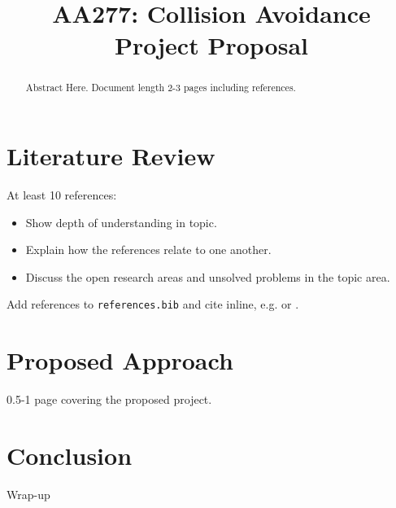 \documentclass[conference]{IEEEtran}
\begin{document}
\title{AA277: Collision Avoidance Project Proposal\\
}

\author{
\and
{}
\and
{}
\and
{}
}

\maketitle

\begin{abstract}
Abstract Here. Document length 2-3 pages including references.
\end{abstract}

\section{Literature Review}
At least 10 references: \begin{itemize}
    \item Show depth of understanding in topic.
    \item Explain how the references relate to one another.
    \item Discuss the open research areas and unsolved problems in the topic area.
\end{itemize}
Add references to \texttt{references.bib} and cite inline, e.g. \cite{eCCA} or \cite{SocialCA, ConfidenceCA}.
\section{Proposed Approach}
0.5-1 page covering the proposed project.
\section{Conclusion}
Wrap-up


\end{document}
